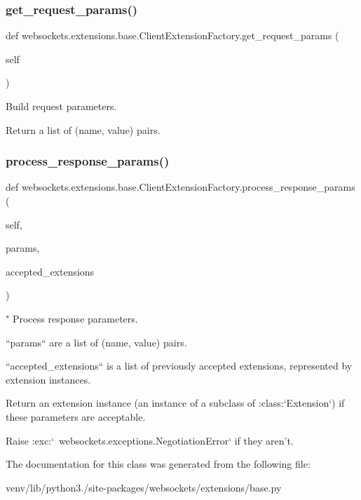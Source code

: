 \subsubsection{\texorpdfstring{get\+\_\+request\+\_\+params()}{get\_request\_params()}}
{\footnotesize\ttfamily def websockets.\+extensions.\+base.\+Client\+Extension\+Factory.\+get\+\_\+request\+\_\+params (\begin{DoxyParamCaption}\item[{}]{self }\end{DoxyParamCaption})}

\begin{DoxyVerb}Build request parameters.

Return a list of (name, value) pairs.\end{DoxyVerb}
 \mbox{\label{classwebsockets_1_1extensions_1_1base_1_1_client_extension_factory_a8ded17af12365d1b4f2c44fd6e0e257c}} 
\subsubsection{\texorpdfstring{process\+\_\+response\+\_\+params()}{process\_response\_params()}}
{\footnotesize\ttfamily def websockets.\+extensions.\+base.\+Client\+Extension\+Factory.\+process\+\_\+response\+\_\+params (\begin{DoxyParamCaption}\item[{}]{self,  }\item[{}]{params,  }\item[{}]{accepted\+\_\+extensions }\end{DoxyParamCaption})}

\begin{DoxyVerb}"
Process response parameters.

``params`` are a list of (name, value) pairs.

``accepted_extensions`` is a list of previously accepted extensions,
represented by extension instances.

Return an extension instance (an instance of a subclass of
:class:`Extension`) if these parameters are acceptable.

Raise :exc:`~websockets.exceptions.NegotiationError` if they aren't.\end{DoxyVerb}
 

The documentation for this class was generated from the following file\+:\begin{DoxyCompactItemize}
\item 
venv/lib/python3./site-\/packages/websockets/extensions/base.\+py\end{DoxyCompactItemize}
